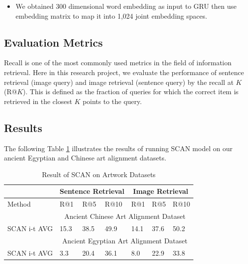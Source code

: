 \begin{itemize}
    \item We obtained 300 dimensional word embedding as input to GRU then use embedding matrix to map it into 1,024 joint embedding spaces.
\end{itemize}

\subsection{Evaluation Metrics}

Recall is one of the most commonly used metrics in the field of information retrieval. Here in this research project, we evaluate the performance of sentence retrieval (image query) and image retrieval (sentence query) by the recall at $K$ (R@$K$). This is defined as the fraction of queries for which the correct item is retrieved in the closest $K$ points to the query. 

\subsection{Results}

The following Table \ref{table:resultscan} illustrates the results of running SCAN model on our ancient Egyptian and Chinese art alignment datasets.

\begin{table}[h!]
\centering
\begin{tabular}{lllllll}
\hline\hline
                       & \multicolumn{3}{c}{Sentence Retrieval} & \multicolumn{3}{c}{Image Retrieval} \\ \hline
Method                 & R@1         & R@5         & R@10       & R@1        & R@5        & R@10      \\ \hline\hline
\multicolumn{1}{r}{}   & \multicolumn{6}{c}{Ancient Chinese Art Alignment Dataset}                   \\ \hline
SCAN i-t AVG & 15.3        & 38.5        & 49.9       & 14.1       & 37.6       & 50.2      \\ \hline\hline
\multicolumn{1}{r}{}   & \multicolumn{6}{c}{Ancient Egyptian Art Alignment Dataset}                    \\ \hline
SCAN i-t AVG & 3.3         & 20.4        & 36.1       & 8.0        & 22.9       & 33.8 \\\hline\hline     
\end{tabular}
\caption{Result of SCAN on Artwork Datasets}
\label{table:resultscan}
\end{table}

